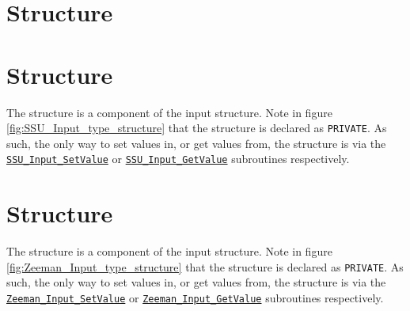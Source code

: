 \clearpage
\section{\Options{} Structure}
\label{sec:options_structure}



\clearpage












\clearpage
\section{\SSUInput{} Structure}
\label{sec:ssu_input_structure}
The \SSUInput{} structure is a component of the \Options{} input structure. Note in figure \ref{fig:SSU_Input_type_structure} that the structure is declared as \texttt{PRIVATE}. As such, the only way to set values in, or get values from, the structure is via the \hyperref[sec:SSU_Input_SetValue_interface]{\texttt{SSU\_Input\_SetValue}} or \hyperref[sec:SSU_Input_GetValue_interface]{\texttt{SSU\_Input\_GetValue}} subroutines respectively.




\clearpage












\clearpage
\section{\ZeemanInput{} Structure}
\label{sec:zeeman_input_structure}
The \ZeemanInput{} structure is a component of the \Options{} input structure. Note in figure \ref{fig:Zeeman_Input_type_structure} that the structure is declared as \texttt{PRIVATE}. As such, the only way to set values in, or get values from, the structure is via the \hyperref[sec:Zeeman_Input_SetValue_interface]{\texttt{Zeeman\_Input\_SetValue}} or \hyperref[sec:Zeeman_Input_GetValue_interface]{\texttt{Zeeman\_Input\_GetValue}} subroutines respectively.

